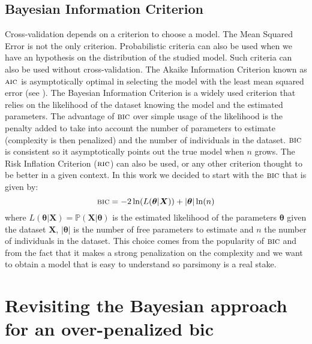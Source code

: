 \documentclass[12pt,a4paper]{report}
\begin{document}
			\subsection{Bayesian Information Criterion}
			Cross-validation depends on a criterion to choose a model. The Mean Squared Error is not the only criterion. Probabilistic criteria can also be used when we have an hypothesis on the distribution of the studied model. Such criteria can also be used without cross-validation. The Akaike Information Criterion \cite{akaike1974new} known as $\mbox{{\sc aic}}$ is asymptotically optimal in selecting the model with the least mean squared error (see \cite{stone1977asymptotic}).
			The Bayesian Information Criterion \cite{BIChuard,schwarz1978estimating,yang2005can} is a widely used criterion that relies on the likelihood of the dataset knowing the model and the estimated parameters. The advantage of $\mbox{{\sc bic}}$ over simple usage of the likelihood is the penalty added to take into account the number of parameters to estimate (complexity is then penalized) and the number of individuals in the dataset. $\mbox{{\sc bic}}$ is consistent so it asymptotically points out the true model when $n$ grows. The Risk Inflation Criterion \cite{foster1994risk} ($\mbox{{\sc ric}}$) can also be used, or any other criterion \cite{george1993variable} thought to be better in a given context.
			In this work we decided to start with the $\mbox{{\sc bic}}$ that is given by:
			\begin{equation}
				\mbox{{\sc bic}}=-2\ln(L(\boldsymbol{\theta}|\boldsymbol{X}))+|\boldsymbol{\theta}|\ln(n)
			\end{equation}
			where $L(\boldsymbol{\theta}|\boldsymbol{X})=\mathbb{P}(\boldsymbol{X}|\boldsymbol{\theta})$ is the estimated likelihood of the parameters $\boldsymbol{\theta}$ given the dataset $\boldsymbol{X}$, $|\boldsymbol{\theta}|$ is the number of free parameters to estimate and $n$ the number of individuals in the dataset. This choice comes from the popularity of $\mbox{{\sc bic}}$ and from the fact that it makes a strong penalization on the complexity and we want to obtain a model that is easy to understand so parsimony is a real stake.
			


\section{Revisiting the Bayesian approach for an over-penalized {\sc bic}} 
\end{document}
